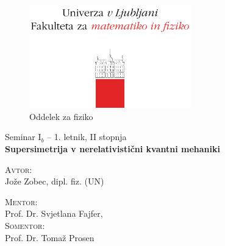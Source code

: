 \begin{titlepage}
	\begin{figure}[H]
		\centering
		\includegraphics[width = 7cm, keepaspectratio=1]{pics/logo.pdf}\\[12pt]
		{\sc Oddelek za fiziko}\\[4cm]
	\end{figure}
	\begin{center}
		\large{Seminar I$_b$ -- 1. letnik, II stopnja}\\[0.5cm]
		\LARGE\textbf{Supersimetrija v nerelativisti\v cni kvantni mehaniki}\\[1.0cm]

		\vspace{0.0cm}

		\begin{minipage}{0.4\textwidth}\small
			\begin{flushleft}
			\textsc{Avtor:}\\[0.2cm]
			Jo\v ze Zobec, dipl. fiz. (UN)
			\end{flushleft}
		\end{minipage}
		\begin{minipage}{0.4\textwidth}\small
			\begin{flushright}
				\textsc{Mentor:}\\[0.2cm]
				Prof. Dr. Svjetlana Fajfer,\\[0.5cm]
				\textsc{Somentor:}\\[0.1cm]
				Prof. Dr. Toma\v z Prosen
			\end{flushright}
		\end{minipage}
	\end{center}

	\vspace{3.5cm}

	\begin{abstract}
		Supersimetrija je podro\v cje, ki je nastalo za potrebe velike teorije poenotenja,
		vendar pa lahko najde rabo tudi drugod v fiziki. V tem seminarju bom pokazal kako
		supersimetri\v cno matemati\v cno ogrodje uporabimo v \v solskih kvantno-mehanskih
		problemih, v teoriji izospektralnih Hamiltonianov in v teoriji perturbacij.
	\end{abstract}
	
	\vfill

\end{titlepage}


